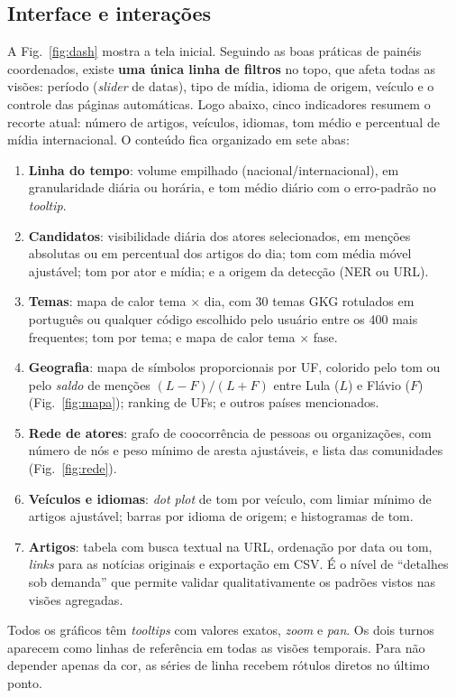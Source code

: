 \documentclass[conference]{IEEEtran}
\begin{document}
\subsection{Interface e interações}
A Fig.~\ref{fig:dash} mostra a tela inicial. Seguindo as boas práticas de painéis coordenados, existe \textbf{uma única linha de filtros} no topo, que afeta todas as visões: período (\emph{slider} de datas), tipo de mídia, idioma de origem, veículo e o controle das páginas automáticas. Logo abaixo, cinco indicadores resumem o recorte atual: número de artigos, veículos, idiomas, tom médio e percentual de mídia internacional. O conteúdo fica organizado em sete abas:
\begin{enumerate}
  \item \textbf{Linha do tempo}: volume empilhado (nacional/internacional), em granularidade diária ou horária, e tom médio diário com o erro-padrão no \emph{tooltip}.
  \item \textbf{Candidatos}: visibilidade diária dos atores selecionados, em menções absolutas ou em percentual dos artigos do dia; tom com média móvel ajustável; tom por ator e mídia; e a origem da detecção (NER ou URL).
  \item \textbf{Temas}: mapa de calor tema $\times$ dia, com 30 temas GKG rotulados em português ou qualquer código escolhido pelo usuário entre os 400 mais frequentes; tom por tema; e mapa de calor tema $\times$ fase.
  \item \textbf{Geografia}: mapa de símbolos proporcionais por UF, colorido pelo tom ou pelo \emph{saldo} de menções $(L-F)/(L+F)$ entre Lula ($L$) e Flávio ($F$) (Fig.~\ref{fig:mapa}); ranking de UFs; e outros países mencionados.
  \item \textbf{Rede de atores}: grafo de coocorrência de pessoas ou organizações, com número de nós e peso mínimo de aresta ajustáveis, e lista das comunidades (Fig.~\ref{fig:rede}).
  \item \textbf{Veículos e idiomas}: \emph{dot plot} de tom por veículo, com limiar mínimo de artigos ajustável; barras por idioma de origem; e histogramas de tom.
  \item \textbf{Artigos}: tabela com busca textual na URL, ordenação por data ou tom, \emph{links} para as notícias originais e exportação em CSV. É o nível de ``detalhes sob demanda'' que permite validar qualitativamente os padrões vistos nas visões agregadas.
\end{enumerate}
Todos os gráficos têm \emph{tooltips} com valores exatos, \emph{zoom} e \emph{pan}. Os dois turnos aparecem como linhas de referência em todas as visões temporais. Para não depender apenas da cor, as séries de linha recebem rótulos diretos no último ponto.
\end{document}
